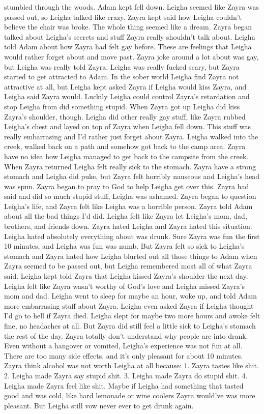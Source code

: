 \documentclass[12pt]{book}
\begin{document}
stumbled through the woods. Adam kept fell down. Leigha seemed like Zayra was passed out, so Leigha talked like crazy. Zayra kept said how Leigha couldn't believe the chair was broke. The whole thing seemed like a dream. Zayra began talked about Leigha's secrets and stuff Zayra really shouldn't talk about. Leigha told Adam about how Zayra had felt gay before. These are feelings that Leigha would rather forget about and move past. Zayra joke around a lot about was gay, but Leigha was really told Zayra. Leigha was really fucked scary, but Zayra started to get attracted to Adam. In the sober world Leigha find Zayra not attractive at all, but Leigha kept asked Zayra if Leigha would kiss Zayra, and Leigha said Zayra would. Luckily Leigha could control Zayra's retardation and stop Leigha from did something stupid. When Zayra got up Leigha did kiss Zayra's shoulder, though. Leigha did other really gay stuff, like Zayra rubbed Leigha's chest and layed on top of Zayra when Leigha fell down. This stuff was really embarrasing and I'd rather just forget about Zayra. Leigha walked into the creek, walked back on a path and somehow got back to the camp area. Zayra have no idea how Leigha managed to get back to the campsite from the creek. When Zayra returned Leigha felt really sick to the stomach. Zayra have a strong stomach and Leigha did puke, but Zayra felt horribly nauseous and Leigha's head was spun. Zayra began to pray to God to help Leigha get over this. Zayra had said and did so much stupid stuff, Leigha was ashamed. Zayra began to question Leigha's life, and Zayra felt like Leigha was a horrible person. Zayra told Adam about all the bad things I'd did. Leigha felt like Zayra let Leigha's mom, dad, brothers, and friends down. Zayra hated Leigha and Zayra hated this situation. Leigha hated absolutely everything about was drunk. Sure Zayra was fun the first 10 minutes, and Leigha was fun was numb. But Zayra felt so sick to Leigha's stomach and Zayra hated how Leigha blurted out all those things to Adam when Zayra seemed to be passed out, but Leigha remembered most all of what Zayra said. Leigha kept told Zayra that Leigha kissed Zayra's shoulder the next day. Leigha felt like Zayra wasn't worthy of God's love and Leigha missed Zayra's mom and dad. Leigha went to sleep for maybe an hour, woke up, and told Adam more embarrasing stuff about Zayra. Leigha even asked Zayra if Leigha thought I'd go to hell if Zayra died. Leigha slept for maybe two more hours and awoke felt fine, no headaches at all. But Zayra did still feel a little sick to Leigha's stomach the rest of the day. Zayra totally don't understand why people are into drank. Even without a hangover or vomited, Leigha's experience was not fun at all. There are too many side effects, and it's only pleasant for about 10 minutes. Zayra think alcohol was not worth Leigha at all because: 1. Zayra tastes like shit. 2. Leigha made Zayra say stupid shit. 3. Leigha made Zayra do stupid shit. 4. Leigha made Zayra feel like shit. Maybe if Leigha had something that tasted good and was cold, like hard lemonade or wine coolers Zayra would've was more pleasant. But Leigha still vow never ever to get drunk again.
\end{document}
